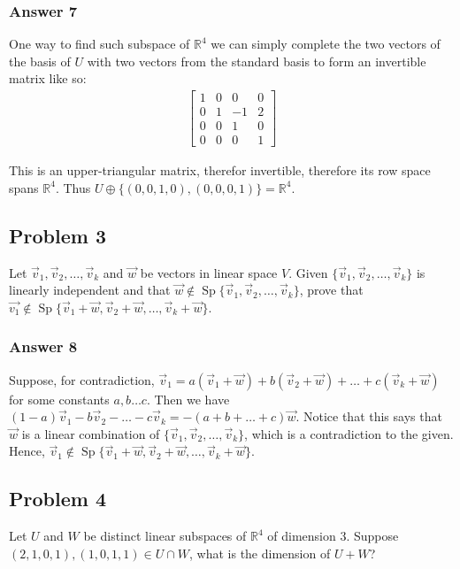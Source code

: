 \documentclass[11pt]{article}
\DeclareMathOperator{\Sp}{Sp}
\begin{document}
\subsubsection{Answer 7}
\label{sec-1-2-4}
One way to find such subspace of $\mathbb{R}^4$ we can simply complete the
two vectors of the basis of $U$ with two vectors from the standard basis to
form an invertible matrix like so:
\begin{align*}
  \begin{bmatrix}
    1 & 0 & 0 & 0 \\
    0 & 1 & -1 & 2 \\ 
    0 & 0 & 1 & 0 \\
    0 & 0 & 0 & 1 
  \end{bmatrix}
\end{align*}

This is an upper-triangular matrix, therefor invertible, therefore its row
space spans $\mathbb{R}^4$.  Thus $U \oplus \{(0,0,1,0),(0,0,0,1)\} =
    \mathbb{R}^4$.

\subsection{Problem 3}
\label{sec-1-3}
Let $\vec{v}_1, \vec{v}_2, \dots, \vec{v}_k$ and $\vec{w}$ be vectors in
linear space $V$.  Given $\{\vec{v}_1, \vec{v}_2, \dots, \vec{v}_k\}$ is
linearly independent and that $\vec{w} \not \in \Sp\{\vec{v}_1, \vec{v}_2,
   \dots, \vec{v}_k\}$, prove that $\vec{v_1} \not \in \Sp\{\vec{v}_1 + \vec{w},
   \vec{v}_2 + \vec{w}, \dots, \vec{v}_k + \vec{w}\}$.

\subsubsection{Answer 8}
\label{sec-1-3-1}
 Suppose, for contradiction, $\vec{v}_1 = a(\vec{v}_1 + \vec{w}) +
   b(\vec{v}_2 + \vec{w}) + \dots + c(\vec{v}_k + \vec{w})$ for some constants
$a, b \dots c$.  Then we have $(1 - a)\vec{v}_1 - b\vec{v}_2 - \dots -
   c\vec{v}_k = -(a + b + \dots + c)\vec{w}$.  Notice that this says that
$\vec{w}$ is a linear combination of $\{\vec{v}_1, \vec{v}_2, \dots,
   \vec{v}_k\}$, which is a contradiction to the given.  Hence, $\vec{v}_1 \not
   \in \Sp\{\vec{v}_1 + \vec{w}, \vec{v}_2 + \vec{w}, \dots, \vec{v}_k +
   \vec{w}\}$.

\subsection{Problem 4}
\label{sec-1-4}
Let $U$ and $W$ be distinct linear subspaces of $\mathbb{R}^4$ of
dimension 3.  Suppose $(2, 1, 0, 1), (1, 0, 1, 1) \in U \cap W$, what is the
dimension of $U + W$?
\end{document}
